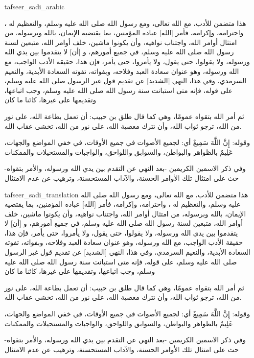 \begin{taggedblock}{tafseer_sadi_arabic}
\begin{Arabic}
هذا متضمن للأدب، مع الله تعالى، ومع رسول الله صلى الله عليه وسلم، والتعظيم له ، واحترامه، وإكرامه، فأمر
[الله]
عباده المؤمنين، بما يقتضيه الإيمان، بالله وبرسوله، من امتثال أوامر الله، واجتناب نواهيه، وأن يكونوا ماشين، خلف أوامر الله، متبعين لسنة رسول الله صلى الله عليه وسلم، في جميع أمورهم، و
[أن]
لا يتقدموا بين يدي الله ورسوله، ولا يقولوا، حتى يقول، ولا يأمروا، حتى يأمر، فإن هذا، حقيقة الأدب الواجب، مع الله ورسوله، وهو عنوان سعادة العبد وفلاحه، وبفواته، تفوته السعادة الأبدية، والنعيم السرمدي، وفي هذا، النهي
[الشديد]
عن تقديم قول غير الرسول صلى الله عليه وسلم، على قوله، فإنه متى استبانت سنة رسول الله صلى الله عليه وسلم، وجب اتباعها، وتقديمها على غيرها، كائنا ما كان

ثم أمر الله بتقواه عمومًا، وهي كما قال طلق بن حبيب: أن تعمل بطاعة الله، على نور من الله، ترجو ثواب الله، وأن تترك معصية الله، على نور من الله، تخشى عقاب الله.

وقوله:
{ إِنَّ اللَّهَ سَمِيعٌ }
أي: لجميع الأصوات في جميع الأوقات، في خفي المواضع والجهات،
{ عَلِيمٌ }
بالظواهر والبواطن، والسوابق واللواحق، والواجبات والمستحيلات والممكنات

وفي ذكر الاسمين الكريمين -بعد النهي عن التقدم بين يدي الله ورسوله، والأمر بتقواه- حث على امتثال تلك الأوامر الحسنة، والآداب المستحسنة، وترهيب عن عدم الامتثال
\end{Arabic}
\end{taggedblock}
\begin{taggedblock}{tafseer_sadi_translation}
هذا متضمن للأدب، مع الله تعالى، ومع رسول الله صلى الله عليه وسلم، والتعظيم له ، واحترامه، وإكرامه، فأمر
[الله]
عباده المؤمنين، بما يقتضيه الإيمان، بالله وبرسوله، من امتثال أوامر الله، واجتناب نواهيه، وأن يكونوا ماشين، خلف أوامر الله، متبعين لسنة رسول الله صلى الله عليه وسلم، في جميع أمورهم، و
[أن]
لا يتقدموا بين يدي الله ورسوله، ولا يقولوا، حتى يقول، ولا يأمروا، حتى يأمر، فإن هذا، حقيقة الأدب الواجب، مع الله ورسوله، وهو عنوان سعادة العبد وفلاحه، وبفواته، تفوته السعادة الأبدية، والنعيم السرمدي، وفي هذا، النهي
[الشديد]
عن تقديم قول غير الرسول صلى الله عليه وسلم، على قوله، فإنه متى استبانت سنة رسول الله صلى الله عليه وسلم، وجب اتباعها، وتقديمها على غيرها، كائنا ما كان

ثم أمر الله بتقواه عمومًا، وهي كما قال طلق بن حبيب: أن تعمل بطاعة الله، على نور من الله، ترجو ثواب الله، وأن تترك معصية الله، على نور من الله، تخشى عقاب الله.

وقوله:
{ إِنَّ اللَّهَ سَمِيعٌ }
أي: لجميع الأصوات في جميع الأوقات، في خفي المواضع والجهات،
{ عَلِيمٌ }
بالظواهر والبواطن، والسوابق واللواحق، والواجبات والمستحيلات والممكنات

وفي ذكر الاسمين الكريمين -بعد النهي عن التقدم بين يدي الله ورسوله، والأمر بتقواه- حث على امتثال تلك الأوامر الحسنة، والآداب المستحسنة، وترهيب عن عدم الامتثال
\end{taggedblock}

\begin{comment}
Please use the following for footnotes:- Sample\footnoteQ{Text of Qur'an footnote goes here.}.
Sample\footnoteT{Text of Tafseer footnote goes here.}.
\end{comment}